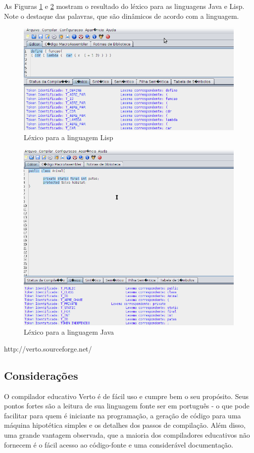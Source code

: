 As Figuras \ref{lisp-lexico} e \ref{java-lexico} mostram o resultado do léxico para as linguagens Java e Lisp.
Note o destaque das palavras, que são dinâmicos de acordo com a linguagem.

\begin{figure}[ht]
	\centering
	\includegraphics[scale=0.7]{imgs/lisp-lexico.png}
	\caption{Léxico para a linguagem Lisp}
	\label{lisp-lexico}
\end{figure}

\begin{figure}[ht]
	\centering
	\includegraphics[scale=0.7]{imgs/java-lexico.png}
	\caption{Léxico para a linguagem Java}
	\label{java-lexico}
\end{figure}

http://verto.sourceforge.net/
\subsection{Considerações}
\label{sub:consideracoes-verto}
O compilador educativo Verto é de fácil uso e cumpre bem o seu propósito.
Seus pontos fortes são a leitura de sua linguagem fonte ser em português -
o que pode facilitar para quem é iniciante na programação, a geração de código para
uma máquina hipotética simples e os detalhes dos passos de compilação.
Além disso, uma grande vantagem observada, que a maioria dos compiladores educativos não fornecem
é o fácil acesso ao código-fonte e uma considerável documentação.

